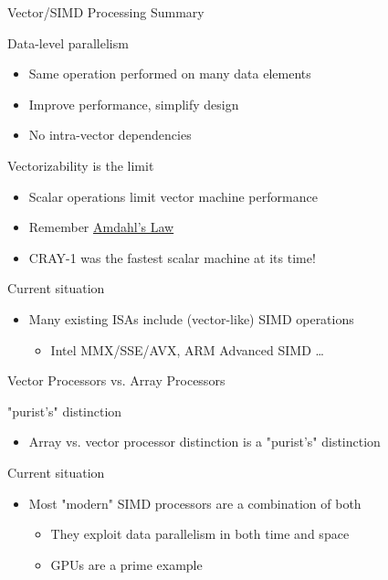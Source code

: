 \documentclass[presentation]{beamer}
\begin{document}
\begin{frame}[label={sec:org825e974}]{Vector/SIMD Processing Summary}
\begin{block}{\alert{Data}-level parallelism}
\begin{itemize}
\item Same operation performed on many data elements
\item Improve performance, simplify design
\item No intra-vector dependencies
\end{itemize}
\end{block}
\begin{block}{\alert{Vectorizability} is the limit}
\begin{itemize}
\item Scalar operations limit vector machine performance
\item Remember \href{https://en.wikipedia.org/wiki/Amdahl\%27s\_law}{Amdahl's Law}
\end{itemize}

\begin{itemize}
\item CRAY-1 was the fastest \alert{scalar} machine at its time!
\end{itemize}
\end{block}
\begin{block}{\alert{Current} situation}
\begin{itemize}
\item Many existing ISAs include (vector-like) SIMD operations
\begin{itemize}
\item Intel MMX/SSE/AVX, ARM Advanced SIMD \ldots{}
\end{itemize}
\end{itemize}
\end{block}
\end{frame}


\begin{frame}[label={sec:org57597cc}]{Vector Processors vs. Array Processors}
\begin{block}{\alert{"purist's"} distinction}
\begin{itemize}
\item Array vs. vector processor distinction is a "purist's" distinction
\end{itemize}
\end{block}

\begin{block}{\alert{Current} situation}
\begin{itemize}
\item Most "modern" SIMD processors are a combination of both
\begin{itemize}
\item They exploit data parallelism in both \alert{time} and \alert{space}
\item GPUs are a prime example
\end{itemize}
\end{itemize}
\end{block}
\end{frame}
\end{document}
